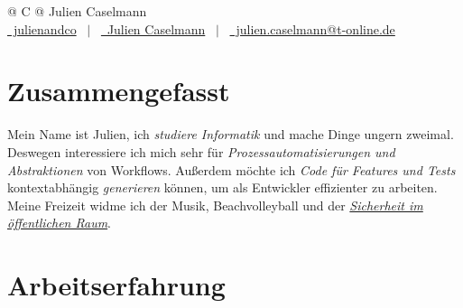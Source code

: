\documentclass[a4paper,12pt]{article}
\begin{document}
\pagestyle{empty} 



\begin{tabularx}{\linewidth}{@{} C @{}}
\Huge{Julien Caselmann} \\[7.5pt]
\href{https://github.com/julienandco}{\raisebox{-0.05\height}\faGithub\ julienandco} \ $|$ \ 
\href{https://www.linkedin.com/in/julien-caselmann-761a2b177/}{\raisebox{-0.05\height}\faLinkedin\ Julien Caselmann} \ $|$ \ 
\href{mailto:julien.caselmann@t-online.de}{\raisebox{-0.05\height}\faEnvelope \ julien.caselmann@t-online.de} \ 
\end{tabularx}


\section{Zusammengefasst}
Mein Name ist Julien, ich \emph{studiere Informatik} und mache Dinge ungern zweimal. Deswegen interessiere ich mich sehr für \emph{Prozessautomatisierungen und Abstraktionen} von Workflows. Außerdem möchte ich \emph{Code für Features und Tests} kontextabhängig \emph{generieren} können, um als Entwickler effizienter zu arbeiten. Meine Freizeit widme ich der Musik, Beachvolleyball und der \emph{\href{https://the-flock.org/}{Sicherheit im öffentlichen Raum}}.

\section{Arbeitserfahrung}
\end{document}
